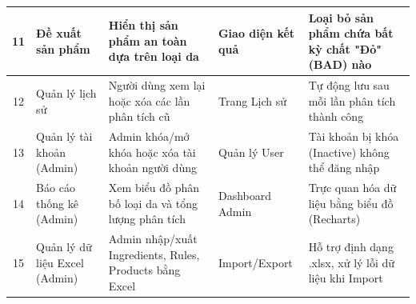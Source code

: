 \documentclass[12pt,a4paper]{article}
\begin{document}
\begin{center}
\begin{tabular}{|c|p{3cm}|p{5cm}|p{2.5cm}|p{3cm}|}
11 & Đề xuất sản phẩm 
& Hiển thị sản phẩm an toàn dựa trên loại da
& Giao diện kết quả 
& Loại bỏ sản phẩm chứa bất kỳ chất "Đỏ" (BAD) nào \\
\hline

12 & Quản lý lịch sử 
& Người dùng xem lại hoặc xóa các lần phân tích cũ
& Trang Lịch sử 
& Tự động lưu sau mỗi lần phân tích thành công \\
\hline

13 & Quản lý tài khoản (Admin)
& Admin khóa/mở khóa hoặc xóa tài khoản người dùng
& Quản lý User 
& Tài khoản bị khóa (Inactive) không thể đăng nhập \\
\hline

14 & Báo cáo thống kê (Admin)
& Xem biểu đồ phân bố loại da và tổng lượng phân tích
& Dashboard Admin 
& Trực quan hóa dữ liệu bằng biểu đồ (Recharts) \\
\hline

15 & Quản lý dữ liệu Excel (Admin)
& Admin nhập/xuất Ingredients, Rules, Products bằng Excel
& Import/Export 
& Hỗ trợ định dạng .xlsx, xử lý lỗi dữ liệu khi Import \\
\hline


\end{tabular}
\end{center}
\end{document}
